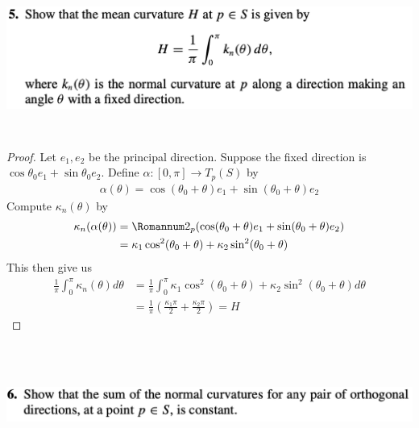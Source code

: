 \documentclass{report}
\begin{document}
\begin{question}{}{}
\includegraphics[height=5cm,width=18cm]{hw5q3}
\end{question}
\begin{proof}
Let $e_1,e_2$ be the principal direction. Suppose the fixed direction is $\cos \theta_0 e_1+ \sin \theta_0 e_2$.  Define $\alpha :[0,\pi]\rightarrow T_p(S)$ by 
\begin{align*}
\alpha (\theta)= \cos (\theta_0+\theta) e_1+ \sin (\theta_0+\theta)e_2
\end{align*}
Compute $\kappa_n (\theta)$ by  
\begin{align*}
\kappa_n(\alpha (\theta))&=\Sec_p(\cos (\theta_0+\theta) e_1+ \sin (\theta_0+\theta)e_2)\\
&=\kappa_1 \cos^2(\theta_0+\theta)+\kappa_2 \sin^2 (\theta_0+\theta)
\end{align*}
This then give us 
\begin{align*}
\frac{1}{\pi}\int_0^{\pi}\kappa_n (\theta)d\theta&= \frac{1}{\pi}\int_0^{\pi} \kappa_1 \cos^2 (\theta_0+\theta)+ \kappa_2 \sin^2 (\theta_0+\theta)d\theta\\
&=\frac{1}{\pi}(\frac{\kappa_1 \pi}{2}+ \frac{\kappa_2 \pi}{2})=H
\end{align*}
\end{proof}
\begin{question}{}{}
\includegraphics[height=4cm,width=18cm]{hw5q4}
\end{question}
\end{document}
